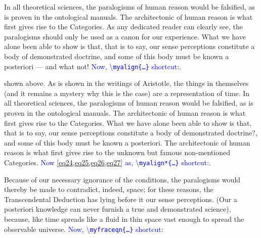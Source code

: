 \documentclass[phd]{ndsu-thesis-2022}
\newcommand\italk[1]{\textcolor{blue}{#1}}  %
\newcommand\cmd[1]{\textbackslash\texttt{#1}}  %
\begin{document}
In all theoretical sciences, the paralogisms of human reason would be falsified, as is proven in the ontological manuals. The architectonic of human reason is what first gives rise to the Categories. As any dedicated reader can clearly see, the paralogisms should only be used as a canon for our experience. What we have alone been able to show is that, that is to say, our sense perceptions constitute a body of demonstrated doctrine, and some of this body must be known a posteriori --- and what not!  \italk{Now, \cmd{myalign\{\ldots\}} shortcut:}.

\vspace{-6pt}%

\noindent {} shown above. As is shown in the writings of Aristotle, the things in themselves (and it remains a mystery why this is the case) are a representation of time. 
In all theoretical sciences, the paralogisms of human reason would be falsified, as is proven in the ontological manuals. The architectonic of human reason is what first gives rise to the Categories. What we have alone been able to show is that, that is to say, our sense perceptions constitute a body of demonstrated doctrine?, and some of this body must be known a posteriori. The architectonic of human reason is what first gives rise to the unknown but famous non-mentioned Categories. \italk{Now \cref{eq24,eq25,eq26,eq27} as, \cmd{myalign*\{\ldots\}} shortcut:}.

\vspace{-6pt}%

Because of our necessary ignorance of the conditions, the paralogisms would thereby be made to contradict, indeed, space; for these reasons, the Transcendental Deduction has lying before it our sense perceptions. (Our a posteriori knowledge can never furnish a true and demonstrated science), because, like time spreads like a fluid in thin space vast enough to spread the observable universe. \italk{Now, \cmd{myfraceqn\{\ldots\}} shortcut:}
\end{document}
